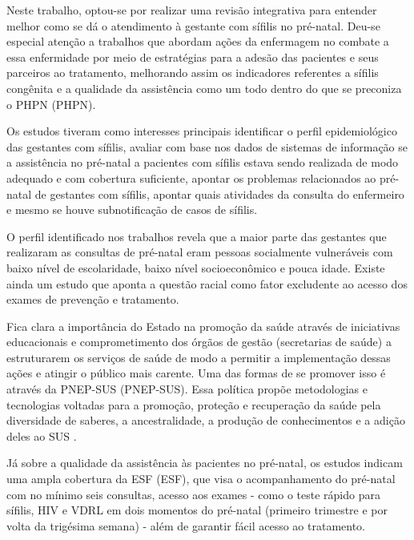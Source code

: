 Neste trabalho, optou-se por realizar uma revisão integrativa para entender melhor como se dá o atendimento à gestante com sífilis no pré-natal. Deu-se especial atenção a trabalhos que abordam ações da enfermagem no combate a essa enfermidade por meio de estratégias para a adesão das pacientes e seus parceiros ao tratamento, melhorando assim os indicadores referentes a sífilis congênita e a qualidade da assistência como um todo dentro do que se preconiza o \acrlong{PHPN} (\acrshort{PHPN}).

Os estudos tiveram como interesses principais identificar o perfil epidemiológico das gestantes com sífilis, avaliar com base nos dados de sistemas de informação se a assistência no pré-natal a pacientes com sífilis estava sendo realizada de modo adequado e com cobertura suficiente, apontar os problemas relacionados ao pré-natal de gestantes com sífilis, apontar quais atividades da consulta do enfermeiro e mesmo se houve subnotificação de casos de sífilis. 

O perfil identificado nos trabalhos revela que a maior parte das gestantes que realizaram as consultas de pré-natal eram pessoas socialmente vulneráveis com baixo nível de escolaridade, baixo nível socioeconômico e pouca idade. Existe ainda um estudo que aponta a questão racial como fator excludente ao acesso dos exames de prevenção e tratamento. \cite{dos2010assistencia,suto2016assistencia,tavares2012monitoramento,da2013sifilis}

Fica clara a importância do Estado na promoção da saúde através de iniciativas educacionais e comprometimento dos órgãos de gestão (secretarias de saúde) a estruturarem os serviços de saúde de modo a permitir a implementação dessas ações e atingir o público mais carente. Uma das formas de se promover isso é através da \acrlong{PNEP-SUS} (\acrshort{PNEP-SUS}). Essa política propõe metodologias e tecnologias voltadas para a promoção, proteção e recuperação da saúde pela diversidade de saberes, a ancestralidade, a produção de conhecimentos e a adição deles ao SUS \cite{vasconcelos1999educaccao}.

Já sobre a qualidade da assistência às pacientes no pré-natal, os estudos indicam uma ampla cobertura da \acrlong{ESF} (\acrshort{ESF}), que visa o acompanhamento do pré-natal com no mínimo seis consultas, acesso aos exames - como o teste rápido para sífilis, \acrshort{HIV} e \acrshort{VDRL} em dois momentos do pré-natal (primeiro trimestre e por volta da trigésima semana) - além de garantir fácil acesso ao tratamento.

